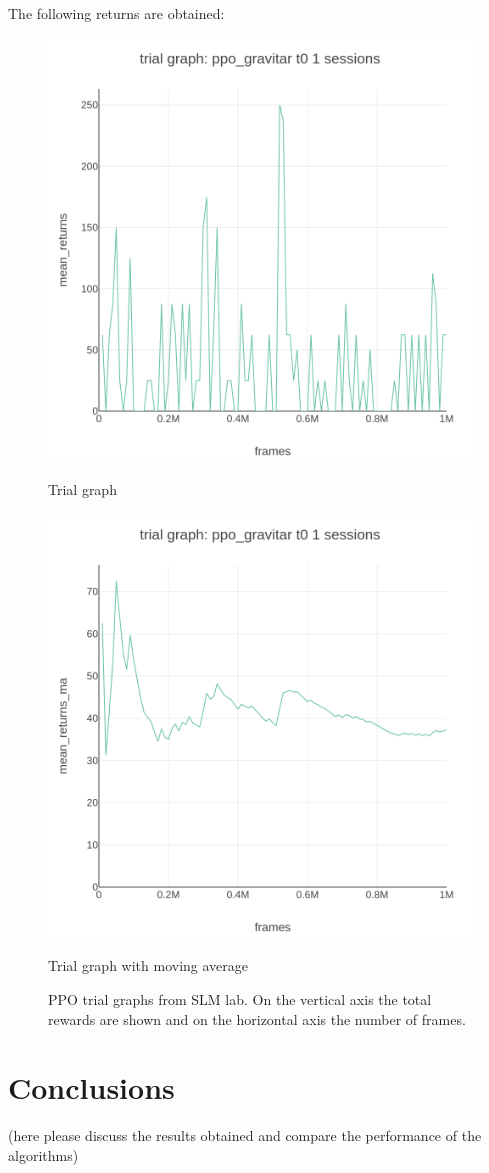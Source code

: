 \documentclass[12pt,a4paper]{report}
\begin{document}
	The following returns are obtained:
	
	\begin{figure}[ht!]
		\begin{minipage}[c]{0.5\linewidth}
			\centering
			\includegraphics[height=0.3\textheight, width=0.9\linewidth]{ppo_gravitar_t0_trial_graph_mean_returns_vs_frames.png}
			\caption{Trial graph}
		\end{minipage}\hfill
		\begin{minipage}[c]{0.5\linewidth}	
			\centering
			\includegraphics[height=0.3\textheight, width=0.9\linewidth]{ppo_gravitar_t0_trial_graph_mean_returns_ma_vs_frames.png}
			\caption{Trial graph with moving average}
		\end{minipage}
		\caption{PPO trial graphs from SLM lab. On the vertical axis the total rewards are shown and on the horizontal axis the number of frames.}
	\end{figure}
	\chapter{Conclusions}
	(here please discuss the results obtained and compare the performance of the algorithms)
	
	
	
\end{document}
